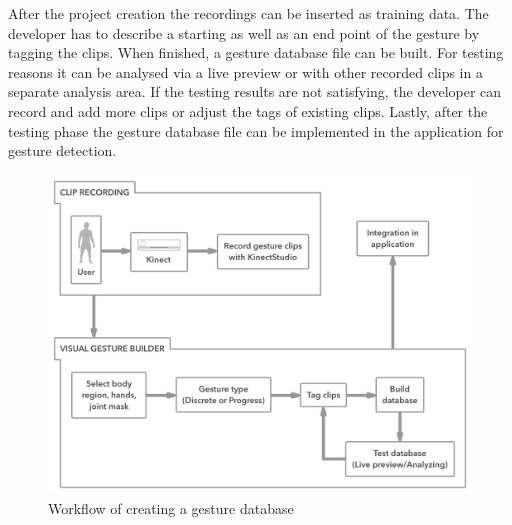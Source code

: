 After the project creation the recordings can be inserted as training data. The developer has to describe a starting as well as an end point of the gesture by tagging the clips. When finished, a gesture database file can be built. For testing reasons it can be analysed via a live preview or with other recorded clips in a separate analysis area. If the testing results are not satisfying, the developer can record and add more clips or adjust the tags of existing clips. Lastly, after the testing phase the gesture database file can be implemented in the application for gesture detection. %
\begin{figure}[htb]
	\centering
	\begin{minipage}[t]{1\linewidth}
		\centering
		\includegraphics[width=1\linewidth]{Pictures/5_3_gestureCreation}
		\caption{Workflow of creating a gesture database}
		\label{fig:5_3_gestureCreation}
	\end{minipage}
\end{figure}
